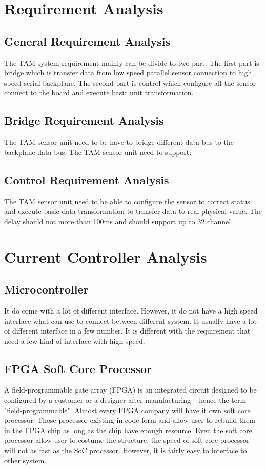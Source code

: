 \documentclass[12pt,article]{memoir}
\begin{document}
\chapter{Requirement Analysis}
\section{General Requirement Analysis}
The TAM system requirement mainly can be divide to two part. The first part is bridge which is transfer data from low speed parallel sensor connection to high speed serial backplane. The second part is control which configure all the sensor connect to the board and execute basic unit transformation.
\section{Bridge Requirement Analysis}
The TAM sensor unit need to be have to bridge different data bus to the backplane data bus. The TAM sensor unit need to support: 
\section{Control Requirement Analysis}
The TAM sensor unit need to be able to configure the sensor to correct status and execute basic data transformation to transfer data to real physical value. The delay should not more than 100ms and should support up to 32 channel.
\newpage
\chapter{Current Controller Analysis}
\section{Microcontroller}
It do come with a lot of different interface. However, it do not have a high speed interface what can use to connect between different system. It usually have a lot of different interface in a few number. It is different with the requirement that need a few kind of interface with high speed.
\section{FPGA Soft Core Processor}
A field-programmable gate array (FPGA) is an integrated circuit designed to be configured by a customer or a designer after manufacturing – hence the term "field-programmable".\cite{Cite Needed} Almost every FPGA company will have it own soft core processor. Those processor existing in code form and allow user to rebuild them in the FPGA chip as long as the chip have enough resource. Even the soft core processor allow user to costume the structure, the speed of soft core processor will not as fast as the SoC processor. However, it is fairly easy to interface to other system.
\end{document}
